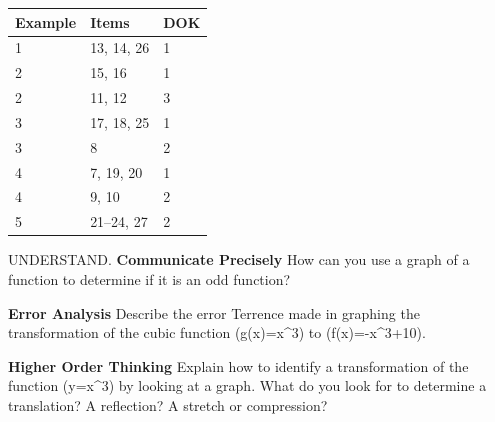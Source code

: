 \documentclass{article}
\newenvironment{item-analysis}{}{}      %
\newenvironment{practice}[2]{}{}        %
\newcommand{\answer}[1]{}               %
\newcommand{\placeholder}[2]{}          %
\newcommand{\te}[1]{}                   %
\begin{document}
\begin{item-analysis}
\begin{tabular}{lll}
\toprule
Example & Items & DOK \\
\midrule
1 & 13, 14, 26 & 1 \\
2 & 15, 16 & 1 \\
2 & 11, 12 & 3 \\
3 & 17, 18, 25 & 1 \\
3 & 8 & 2 \\
4 & 7, 19, 20 & 1 \\
4 & 9, 10 & 2 \\
5 & 21--24, 27 & 2 \\
\bottomrule
\end{tabular}
\end{item-analysis}
\begin{practice}{7}{1}
UNDERSTAND. \textbf{Communicate Precisely} How can you use a graph of a function to determine if it is an odd function?
\answer{Rotate the graph 180 degrees about the origin. If the result is the same graph, then the function is an odd function.}
\end{practice}
\begin{practice}{8}{2}
\textbf{Error Analysis} Describe the error Terrence made in graphing the transformation of the cubic function (g(x)=x^3) to (f(x)=-x^3+10).
\placeholder{graph}{Student's incorrect red increasing cubic labeled f(x), inflection at (0,10), through about (-2,6),(2,14); arrows lower left and upper right. Light blue unit x grid and y grid5, x labels -4,-2,2,4, y -20,-10,10,20, O. Displayed window approximately x -5 to5,y -25 to25.}
\answer{The graph should be reflected across the (x)-axis before being translated, because the coefficient, (-\frac{1}{2}), is negative.}
\end{practice}
\begin{practice}{9}{2}
\textbf{Higher Order Thinking} Explain how to identify a transformation of the function (y=x^3) by looking at a graph. What do you look for to determine a translation? A reflection? A stretch or compression?
\answer{To determine a translation, look at the point where the graph is least steep. That point is at the origin in the parent graph, so the coordinates of that point in the new graph show the translation. To determine a reflection, look at the end behaviors. If the end behavior of the new function matches that of the parent function, there is no reflection. If not, look to see whether the reflection is across the (x)- or (y)-axis. To determine a stretch or compression, look at the (y)-values of a pair of points one (x)-unit apart in the parent and in the new function. If the ratio of the (y)-values in the parent is different from the ratio of (y)-values in the new graph, then there is a stretch or compression. The ratio of the two ratios gives its value.}
\te{Printed ratio-of-ratios rule does not generally determine a vertical scale factor.}
\end{practice}
\end{document}
